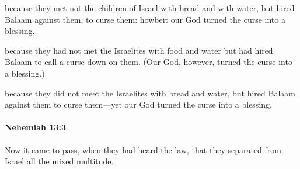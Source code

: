 			\begin{versebox}
					\item[BHS] 
					\item[LXX] 
					\item[ASV] because they met not the children of Israel with bread and with water, but hired Balaam against them, to curse them: howbeit our God turned the curse into a blessing.
					\item[NIV] because they had not met the Israelites with food and water but had hired Balaam to call a curse down on them. (Our God, however, turned the curse into a blessing.)
					\item[NRSV] because they did not meet the Israelites with bread and water, but hired Balaam against them to curse them—yet our God turned the curse into a blessing.
			\end{versebox}

		\paragraph{Nehemiah 13:3} %
			\label{NEHEMIAH-13-3}

			Now it came to pass, when they had heard the law, that they separated from Israel all the mixed multitude.

